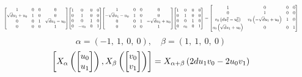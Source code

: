\documentclass[11pt]{article}
\theoremstyle{definition}
\begin{document}
\[
\scaletoalign{\textwidth}{{\left[\begin{matrix}1 & 0 & 0 & 0\\\sqrt{d} u_{1} + u_{0} & 1 & 0 & 0\\0 & 0 & 1 & \sqrt{d} u_{1} - u_{0}\\0 & 0 & 0 & 1\end{matrix}\right]} {\left[\begin{matrix}1 & 0 & 0 & 0\\0 & 1 & 0 & 0\\0 & 0 & 1 & 0\\0 & - v_{0} & 0 & 1\end{matrix}\right]} {\left[\begin{matrix}1 & 0 & 0 & 0\\- \sqrt{d} u_{1} - u_{0} & 1 & 0 & 0\\0 & 0 & 1 & - \sqrt{d} u_{1} + u_{0}\\0 & 0 & 0 & 1\end{matrix}\right]} {\left[\begin{matrix}1 & 0 & 0 & 0\\0 & 1 & 0 & 0\\0 & 0 & 1 & 0\\0 & v_{0} & 0 & 1\end{matrix}\right]} = {\left[\begin{matrix}1 & 0 & 0 & 0\\0 & 1 & 0 & 0\\v_{0} \left(d u_{1}^{2} - u_{0}^{2}\right) & v_{0} \left(- \sqrt{d} u_{1} + u_{0}\right) & 1 & 0\\v_{0} \left(\sqrt{d} u_{1} + u_{0}\right) & 0 & 0 & 1\end{matrix}\right]}}
\]
\[
\alpha = \left( -1, \  1, \  0, \  0\right), \quad \beta = \left( 1, \  1, \  0, \  0\right)
\]
\[
\scaletoalign{\textwidth}{\left[ X_{\alpha}\left(\left[\begin{matrix}u_{0}\\u_{1}\end{matrix}\right]\right), X_{\beta}\left(\left[\begin{matrix}v_{0}\\v_{1}\end{matrix}\right]\right) \right] = X_{\alpha + \beta}\left(2 d u_{1} v_{0} - 2 u_{0} v_{1}\right)}
\]
\end{document}
